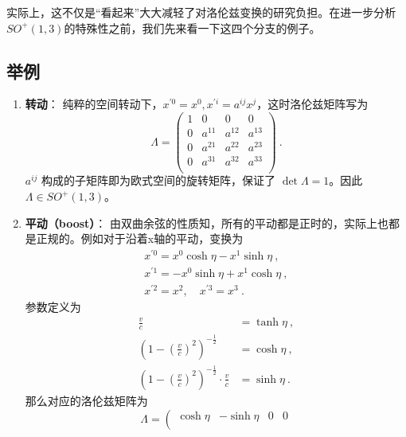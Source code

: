 实际上，这不仅是“看起来”大大减轻了对洛伦兹变换的研究负担。在进一步分析$SO^+(1,3)$的特殊性之前，我们先来看一下这四个分支的例子。
\subsection{举例}
\begin{enumerate}
\item \textbf{转动}： 纯粹的空间转动下，$x^{\prime 0}=x^{0}, x^{\prime i}=a^{i j} x^{j}$，这时洛伦兹矩阵写为
\begin{equation}       %
\Lambda=\left(                 %
  \begin{array}{cccc}   %
   1& 0 & 0 & 0\\  %
   0& a^{11} &  a^{12} &  a^{13}\\  %
   0& a^{21} &  a^{22} &  a^{23}\\  %
   0& a^{31} &  a^{32} &  a^{33}\\  %
  \end{array}
\right)  ~.               %
\end{equation}
 $a^{ij}$ 构成的子矩阵即为欧式空间的旋转矩阵，保证了 $\det\Lambda=1$。因此$\Lambda\in SO^+(1,3)$。
\item \textbf{平动（boost）}： 由双曲余弦的性质知，所有的平动都是正时的，实际上也都是正规的。例如对于沿着x轴的平动，变换为
\begin{equation}\begin{array}{c}
x^{\prime 0}=x^{0} \cosh \eta-x^{1} \sinh \eta~, \\
x^{\prime 1}=-x^{0} \sinh \eta+x^{1} \cosh \eta ~,\\
x^{\prime 2}=x^{2}, \quad x^{\prime 3}=x^{3}~.
\end{array}\end{equation}
参数定义为
\begin{equation}
\begin{aligned}
 \frac{v}{c} &=\tanh\eta ~,\\
\left(1-(\frac{v}{c})^2 \right)^{-\frac{1}{2}} &=\cosh\eta~,\\
\left   (1-(\frac{v}{c})^2 \right)^{-\frac{1}{2}}\cdot\frac{v}{c}&=\sinh\eta~. 
\end{aligned}
\end{equation}
那么对应的洛伦兹矩阵为
\begin{equation}\Lambda=\left(\begin{array}{cccc}
\cosh \eta & -\sinh \eta & 0 & 0 \\

\end{array}
\end{equation}
\end{enumerate}
